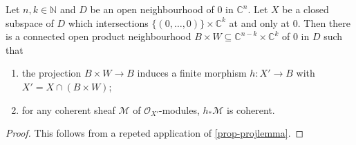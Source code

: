 \begin{corollary}\label{cor-projlemma}
    Let $n,k\in \mathbb{N}$ and $D$ be an open neighbourhood of $0$ in $\mathbb{C}^n$. 
    Let $X$ be a closed subspace of $D$ which intersections $\{(0,\ldots,0)\}\times \mathbb{C}^k$ at and only at $0$. Then there is a connected open product neighbourhood $B\times W\subseteq \mathbb{C}^{n-k}\times \mathbb{C}^k$ of $0$ in $D$ such that 
    \begin{enumerate}
        \item the projection $B\times W\rightarrow B$ induces a finite morphism $h:X'\rightarrow B$ with $X'=X\cap (B\times W)$;
        \item for any coherent sheaf $\mathcal{M}$ of $\mathcal{O}_{X'}$-modules, $h_*\mathcal{M}$ is coherent.
    \end{enumerate}
\end{corollary}
\begin{proof}
    This follows from a repeted application of \cref{prop-projlemma}.
\end{proof}

